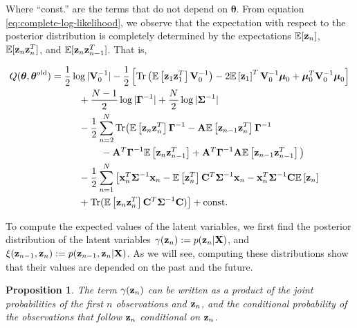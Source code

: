 \documentclass[11pt]{article}
\numberwithin{equation}{section}
\newcommand{\expectation}[1]{\mathbb{E}\left[#1\right]}
\newcommand{\x}{{\bf x}}
\newcommand{\z}{{\bf z}}
\newtheorem{proposition}{Proposition}[section]
\begin{document}
Where ``const.'' are the terms that do not depend on $\boldsymbol{\theta}$. From equation \eqref{eq:complete-log-likelihood}, we observe that the expectation with respect to the posterior distribution is completely determined by the expectations $\mathbb{E}[\z_n]$, $\mathbb{E}[\z_n\z_{n}^{T}]$, and  $\mathbb{E}[\z_n\z_{n-1}^{T}]$. That is,

\begin{align}
	Q(\boldsymbol\theta, \boldsymbol\theta^\text{old}) &= \frac{1}{2}\log \vert
	  {\bf V}_0^{-1}\vert -\frac{1}{2}\left[\text{Tr}\left(\mathbb{E}\left[\z_1 \z_1^T\right] {\bf V}_0^{-1}\right) -2 \mathbb{E}\left[\z_1\right]^T{\bf V}_0^{-1}\boldsymbol\mu_0 + \boldsymbol\mu_0^T {\bf V}_0^{-1}\boldsymbol\mu_0\right] \nonumber \\
	  &\hspace{1cm}+ \frac{N-1}{2}\log\vert\boldsymbol\Gamma^{-1}\vert + \frac{N}{2}\log\vert \boldsymbol\Sigma^{-1}\vert \nonumber \\
	  &\hspace{1cm}-\frac{1}{2} \sum_{n=2}^{N}\text{Tr}\big(\expectation{\z_n\z_n^T}\boldsymbol\Gamma^{-1} - {\bf A}\expectation{\z_{n-1}\z_n^T}\boldsymbol\Gamma^{-1} \nonumber\\
	  &\hspace{1.8cm} - {\bf A}^T\boldsymbol{\Gamma}^{-1}\expectation{\z_n\z_{n-1}^T} + {\bf A}^T\boldsymbol\Gamma^{-1}{\bf A}\expectation{\z_{n-1}\z_{n-1}^T}\big) \nonumber\\
	  &\hspace{1cm}-\frac{1}{2}\sum_{n=1}^N\big[\x_n^T\boldsymbol{\Sigma}^{-1}\x_n-\expectation{\z_n^T}{\bf C}^T \boldsymbol\Sigma^{-1}\x_n - \x_n^T\boldsymbol\Sigma^{-1}{\bf C}\expectation{\z_n} \nonumber\\
	  &\hspace{1cm} + \text{Tr}(\mathbb{E}\left[\z_n\z_n^T\right]{\bf C}^T\boldsymbol\Sigma^{-1}{\bf C})\big] + \text{const.}  \label{eq:Q-LDS}
\end{align}


To compute the expected values of the latent variables, we first find the posterior distribution of the latent variables $\gamma(\z_n) := p(\z_n\vert {\bf X})$, and $\xi(\z_{n-1}, \z_{n}) := p(\z_{n-1}, \z_n\vert {\bf X})$. As we will see, computing these distributions show that their values are depended on the past and the future.


\begin{proposition}\label{prop:gamma-factorisation}
	The term $\gamma(\z_n)$ can be written as a product of the joint probabilities of the first $n$ observations and $\z_n$, and the conditional probability of the observations that follow $\z_n$ conditional on $\z_n$.
\end{proposition}
\end{document}
